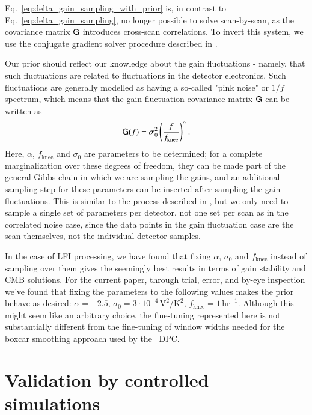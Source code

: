 \documentclass[twocolumn]{aa}
\newcommand{\tG}[0]{\tens{G}}
\begin{document}
Eq.~\eqref{eq:delta_gain_sampling_with_prior} is, in contrast to Eq.~\eqref{eq:delta_gain_sampling}, no longer possible to solve scan-by-scan, as the covariance matrix $\tG$ introduces cross-scan correlations. To invert this system, we use the conjugate gradient solver procedure described in \citet{bp01}.

Our prior should reflect our knowledge about the gain fluctuations - namely, that such fluctuations are related to fluctuations in the detector electronics. Such fluctuations are generally modelled as having a so-called "pink noise" or $1/f$ spectrum, which means that the gain fluctuation covariance matrix $\tG$ can be written as
\begin{equation}
    \tG(f) = \sigma_0^2\left(\frac{f}{f_{\textrm{knee}}}\right)^\alpha.
\end{equation}
Here, $\alpha$, $f_{\textrm{knee}}$ and $\sigma_0$ are parameters to be determined; for a complete marginalization over these degrees of freedom, they can be made part of the general Gibbs chain in which we are sampling the gains, and an additional sampling step for these parameters can be inserted after sampling the gain fluctuations. This is similar to the process described in \citet{bp06}, but we only need to sample a single set of parameters per detector, not one set per scan as in the correlated noise case, since the data points in the gain fluctuation case are the scan themselves, not the individual detector samples.

In the case of LFI processing, we have found that fixing $\alpha$, $\sigma_0$ and $f_{\textrm{knee}}$ instead of sampling over them gives the seemingly best results in terms of gain stability and CMB solutions. For the current paper, through trial, error, and by-eye inspection we've found that fixing the parameters to the following values makes the prior behave as desired: $\alpha = -2.5$, $\sigma_0 = 3\cdot 10^{-4}\,\textrm{V}^2/\textrm{K}^2$, $f_{\textrm{knee}} = 1\, \textrm{hr}^{-1}$. Although this might seem like an arbitrary choice, the fine-tuning represented here is not substantially different from the fine-tuning of window widths needed for the boxcar smoothing approach used by the \Planck\ DPC.

\section{Validation by controlled simulations}
\end{document}

